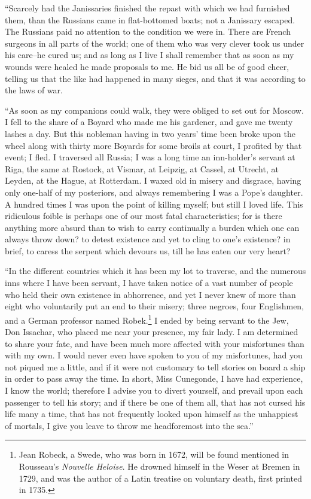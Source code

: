 ``Scarcely had the Janissaries finished the repast with which we had furnished them, than the Russians came in flat-bottomed boats; not a Janissary escaped. The Russians paid no attention to the condition we were in. There are French surgeons in all parts of the world; one of them who was very clever took us under his care--he cured us; and as long as I live I shall remember that as soon as my wounds were healed he made proposals to me. He bid us all be of good cheer, telling us that the like had happened in many sieges, and that it was according to the laws of war.

``As soon as my companions could walk, they were obliged to set out for Moscow. I fell to the share of a Boyard who made me his gardener, and gave me twenty lashes a day. But this nobleman having in two years' time been broke upon the wheel along with thirty more Boyards for some broils at court, I profited by that event; I fled. I traversed all Russia; I was a long time an inn-holder's servant at Riga, the same at Rostock, at Vismar, at Leipzig, at Cassel, at Utrecht, at Leyden, at the Hague, at Rotterdam. I waxed old in misery and disgrace, having only one-half of my posteriors, and always remembering I was a Pope's daughter. A hundred times I was upon the point of killing myself; but still I loved life. This ridiculous foible is perhaps one of our most fatal characteristics; for is there anything more absurd than to wish to carry continually a burden which one can always throw down? to detest existence and yet to cling to one's existence? in brief, to caress the serpent which devours us, till he has eaten our very heart?

``In the different countries which it has been my lot to traverse, and the numerous inns where I have been servant, I have taken notice of a vast number of people who held their own existence in abhorrence, and yet I never knew of more than eight who voluntarily put an end to their misery; three negroes, four Englishmen, and a German professor named Robek.\footnote{Jean Robeck, a Swede, who was born in 1672, will be found mentioned in Rousseau's \textit{Nouvelle Heloise}. He drowned himself in the Weser at Bremen in 1729, and was the author of a Latin treatise on voluntary death, first printed in 1735.} I ended by being servant to the Jew, Don Issachar, who placed me near your presence, my fair lady. I am determined to share your fate, and have been much more affected with your misfortunes than with my own. I would never even have spoken to you of my misfortunes, had you not piqued me a little, and if it were not customary to tell stories on board a ship in order to pass away the time. In short, Miss Cunegonde, I have had experience, I know the world; therefore I advise you to divert yourself, and prevail upon each passenger to tell his story; and if there be one of them all, that has not cursed his life many a time, that has not frequently looked upon himself as the unhappiest of mortals, I give you leave to throw me headforemost into the sea.''

